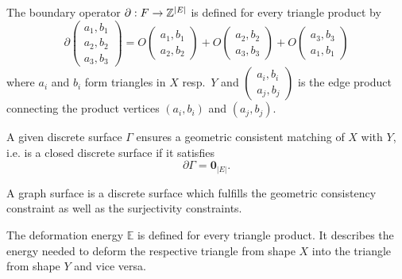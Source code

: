 \begin{definition}
	The boundary operator $\partial : F \rightarrow \mathbb{Z}^{\lvert E\rvert}$ is defined for every triangle product by
	\begin{equation}
		\partial \begin{pmatrix} a_1, b_1 \\ a_2, b_2 \\ a_3, b_3 \end{pmatrix}
		=
		O\begin{pmatrix} a_1,b_1 \\ a_2,b_2 \end{pmatrix}
		+
		O\begin{pmatrix} a_2,b_2 \\ a_3,b_3 \end{pmatrix}
		+
		O\begin{pmatrix} a_3,b_3 \\ a_1,b_1 \end{pmatrix}
	\end{equation}
	where $a_i$ and $b_i$ form triangles in $X$ resp.\ $Y$ and $\begin{pmatrix} a_i,b_i \\ a_j,b_j \end{pmatrix}$ is the edge product connecting the product vertices $(a_i,b_i)$ and $(a_j,b_j)$.
\end{definition}

\begin{definition}
	A given discrete surface $\Gamma$ ensures a geometric consistent matching of $X$ with $Y$, i.e. is a closed discrete surface if it satisfies
	\begin{equation}
		\partial
		\Gamma
		= 
		\boldsymbol{0}_{|E|}.
	\end{equation}
\end{definition}

\begin{definition}
	A graph surface is a discrete surface which fulfills the geometric consistency constraint as well as the surjectivity constraints.
\end{definition}

\begin{definition}
	The deformation energy $ \mathbb{E}$ is defined for every triangle product. It describes the energy needed to deform the respective triangle from shape $X$ into the triangle from shape $Y$ and vice versa.
\end{definition}

